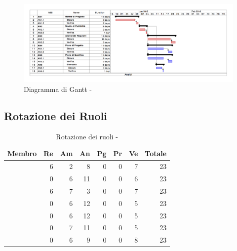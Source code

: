 \documentclass[12pt,a4paper]{article}
\begin{document}
\begin{center}
	\begin{figure}[H]
		\centering
		\includegraphics[width=\textwidth]{GanttAnalisi.png}
		\caption{Diagramma di Gantt - \FA}
	\end{figure}
\end{center}


\newpage

\subsection{Rotazione dei Ruoli}

\begin{table}[H]
	\begin{center}
		\begin{tabular}{l r r r r r r r}
			\toprule
			\textbf{Membro}	&	\textbf{Re}	&	\textbf{Am}	& \textbf{An} & \textbf{Pg} & \textbf{Pr} & \textbf{Ve} & \textbf{Totale}\\
			\midrule
			\midrule
			\IB & 6 & 2 & 8 & 0 & 0 & 7 & 23 \\
			\midrule
			\AB & 0 & 6 & 11 & 0 & 0 & 6 & 23 \\
			\midrule
			\NDC & 6 & 7 & 3 & 0 & 0 & 7 & 23 \\
			\midrule
			\TP & 0 & 6 & 12 & 0 & 0 & 5 & 23 \\
			\midrule
			\WS & 0 & 6 & 12 & 0 & 0 & 5 & 23 \\
			\midrule
			\AVE & 0 & 7 & 11 & 0 & 0 & 5 & 23 \\
			\midrule
			\AVI & 0 & 6 & 9 & 0 & 0 & 8 & 23 \\
			\bottomrule
		\end{tabular}
		\caption{Rotazione dei ruoli - \FA}
	\end{center}
\end{table}
\end{document}
